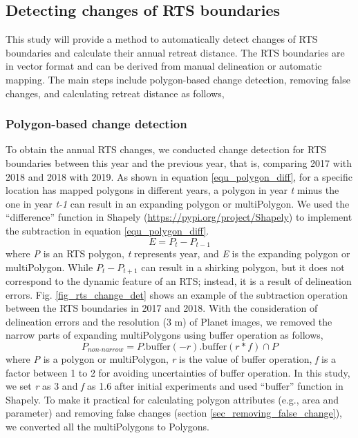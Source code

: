 \documentclass[authoryear,preprint,review,12pt]{elsarticle}
\begin{document}
\subsection{Detecting changes of RTS boundaries}
\label{sec_detect_rts_changes}

This study will provide a method to automatically detect changes of RTS boundaries and calculate their annual retreat distance.
The RTS boundaries are in vector format and can be derived from manual delineation or automatic mapping. 
The main steps include polygon-based change detection, removing false changes, and calculating retreat distance as follows, 

\subsubsection{Polygon-based change detection}
\label{sec_polygon_change_det}

To obtain the annual RTS changes, we conducted change detection for RTS boundaries between this year and the previous year, that is, comparing 2017 with 2018 and 2018 with 2019. 
 As shown in equation \ref{equ_polygon_diff}, for a specific location has mapped polygons in different years, a polygon in year \emph{t} minus the one in year \emph{t-1} can result in an expanding polygon or multiPolygon. 
We used the ``difference'' function in Shapely (\url{https://pypi.org/project/Shapely}) to implement the subtraction in equation \ref{equ_polygon_diff}.
\begin{equation}
E= P_{t} - P_{t-1}
\label{equ_polygon_diff}
\end{equation}
where \emph{P} is an RTS polygon, \emph{t} represents year, and \emph{E} is the expanding polygon or multiPolygon. 
While $P_{t} - P_{t+1}$ can result in a shirking polygon, but it does not correspond to the dynamic feature of an RTS; instead, it is a result of delineation errors. 
Fig. \ref{fig_rts_change_det} shows an example of the subtraction operation between the RTS boundaries in 2017 and 2018. 
With the consideration of delineation errors and the resolution (3 m) of Planet images, we removed the narrow parts of expanding multiPolygons using buffer operation as follows, 
\begin{equation}
P_{non\text{-}narrow}= P.\text{buffer}(-r).\text{buffer}(r*f) \cap P
\label{equ_polygon_buffer}
\end{equation}
where \emph{P} is a polygon or multiPolygon, \emph{r} is the value of buffer operation,  \emph{f} is a factor between 1 to 2 for avoiding uncertainties of buffer operation. 
In this study, we set \emph{r} as 3 and \emph{f} as 1.6 after initial experiments and used ``buffer'' function in Shapely.
To make it practical for calculating polygon attributes (e.g., area and parameter) and removing false changes (section \ref{sec_removing_false_change}), we converted all the multiPolygons to Polygons.
\end{document}
